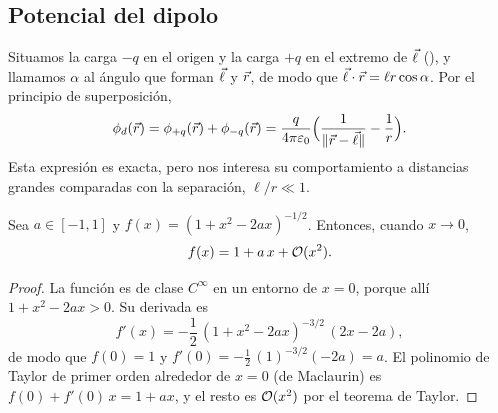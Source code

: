 \subsection{Potencial del dipolo}\label{sec:dipolo-potencial}
Situamos la carga $-q$ en el origen y la carga $+q$ en el extremo de $\vec{\ell}$ (), y llamamos $\alpha$ al ángulo
que forman $\vec{\ell}$ y $\vec{r}$, de modo que $\vec{\ell}\cdot\vec{r}=\ell r\cos\alpha$. Por el principio de superposición,
\begin{equation}\label{eq:pot-dipolo-exacto}
  \phi_{d}(\vec{r})=\phi_{+q}(\vec{r})+\phi_{-q}(\vec{r})=\frac{q}{4\pi\varepsilon_{0}}\Bigl(\frac{1}{\lVert \vec{r}-\vec{\ell}\rVert}-\frac{1}{r}\Bigr).
\end{equation}
Esta expresión es exacta, pero nos interesa su comportamiento a distancias grandes comparadas con la separación, $\ell/r\ll1$.



\begin{lema}\label{lem:taylor}
Sea $a\in[-1,1]$ y $f(x)=(1+x^{2}-2ax)^{-1/2}$. Entonces, cuando $x\to0$,
\begin{equation}\label{eq:lema-taylor}
  f(x)=1+a\,x+\mathcal{O}(x^{2}).
\end{equation}
\end{lema}
\begin{proof}
La función es de clase $C^{\infty}$ en un entorno de $x=0$, porque allí $1+x^{2}-2ax>0$. Su derivada es
\[
  f'(x)=-\frac{1}{2}\,(1+x^{2}-2ax)^{-3/2}\,(2x-2a),
\]
de modo que $f(0)=1$ y $f'(0)=-\frac12\,(1)^{-3/2}(-2a)=a$. El polinomio de Taylor de primer orden alrededor de $x=0$ (de Maclaurin) es
$f(0)+f'(0)\,x=1+ax$, y el resto es $\mathcal{O}(x^{2})$ por el teorema de Taylor.
\end{proof}

